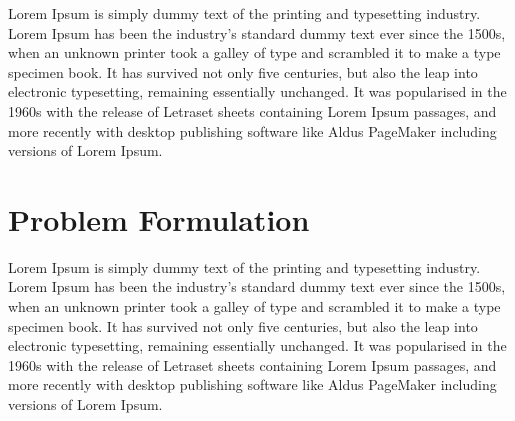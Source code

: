 \documentclass[12pt,a4paper]{report}
\begin{document}
Lorem Ipsum is simply dummy text of the printing and typesetting industry. Lorem Ipsum has been the industry's standard dummy text ever since the 1500s, when an unknown printer took a galley of type and scrambled it to make a type specimen book. It has survived not only five centuries, but also the leap into electronic typesetting, remaining essentially unchanged. It was popularised in the 1960s with the release of Letraset sheets containing Lorem Ipsum passages, and more recently with desktop publishing software like Aldus PageMaker including versions of Lorem Ipsum.


\section{Problem Formulation}
Lorem Ipsum is simply dummy text of the printing and typesetting industry. Lorem Ipsum has been the industry's standard dummy text ever since the 1500s, when an unknown printer took a galley of type and scrambled it to make a type specimen book. It has survived not only five centuries, but also the leap into electronic typesetting, remaining essentially unchanged. It was popularised in the 1960s with the release of Letraset sheets containing Lorem Ipsum passages, and more recently with desktop publishing software like Aldus PageMaker including versions of Lorem Ipsum.
\end{document}
